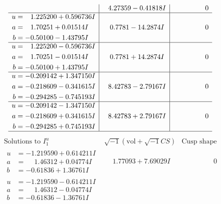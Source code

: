 \documentclass[1p]{elsarticle_modified}
\theoremstyle{definition}
\newcommand{\I}{\sqrt{-1}}
\begin{document}
$$\begin{array}{c|c|c}
 & \phantom{-}4.27359 - 0.41818 I & \phantom{-0.000000 } 0 \\ \hline\begin{aligned}
u &= \phantom{-}1.225200 + 0.596736 I \\
a &= \phantom{-}1.70251 + 0.01514 I \\
b &= -0.50100 - 1.43795 I\end{aligned}
 & \phantom{-}0.7781 - 14.2874 I & \phantom{-0.000000 } 0 \\ \hline\begin{aligned}
u &= \phantom{-}1.225200 - 0.596736 I \\
a &= \phantom{-}1.70251 - 0.01514 I \\
b &= -0.50100 + 1.43795 I\end{aligned}
 & \phantom{-}0.7781 + 14.2874 I & \phantom{-0.000000 } 0 \\ \hline\begin{aligned}
u &= -0.209142 + 1.347150 I \\
a &= -0.218609 - 0.341615 I \\
b &= -0.294285 - 0.745193 I\end{aligned}
 & \phantom{-}8.42783 - 2.79167 I & \phantom{-0.000000 } 0 \\ \hline\begin{aligned}
u &= -0.209142 - 1.347150 I \\
a &= -0.218609 + 0.341615 I \\
b &= -0.294285 + 0.745193 I\end{aligned}
 & \phantom{-}8.42783 + 2.79167 I & \phantom{-0.000000 } 0\\
 \hline 
 \end{array}$$\newpage$$\begin{array}{c|c|c}  
\text{Solutions to }I^u_{1}& \I (\text{vol} + \sqrt{-1}CS) & \text{Cusp shape}\\
 \hline 
\begin{aligned}
u &= -1.219590 + 0.614211 I \\
a &= \phantom{-}1.46312 + 0.04774 I \\
b &= -0.61836 + 1.36761 I\end{aligned}
 & \phantom{-}1.77093 + 7.69029 I & \phantom{-0.000000 } 0 \\ \hline\begin{aligned}
u &= -1.219590 - 0.614211 I \\
a &= \phantom{-}1.46312 - 0.04774 I \\
b &= -0.61836 - 1.36761 I\end{aligned}

\end{array}$$
\end{document}
